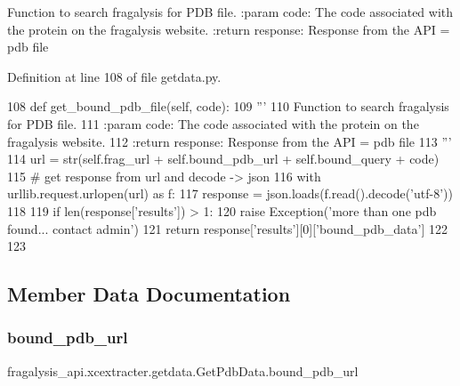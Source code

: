 \begin{DoxyVerb}Function to search fragalysis for PDB file.
:param code: The code associated with the protein on the fragalysis website.
:return response: Response from the API = pdb file
\end{DoxyVerb}
 

Definition at line 108 of file getdata.\+py.


\begin{DoxyCode}
108     \textcolor{keyword}{def }get\_bound\_pdb\_file(self, code):
109         \textcolor{stringliteral}{'''}
110 \textcolor{stringliteral}{        Function to search fragalysis for PDB file.}
111 \textcolor{stringliteral}{        :param code: The code associated with the protein on the fragalysis website.}
112 \textcolor{stringliteral}{        :return response: Response from the API = pdb file}
113 \textcolor{stringliteral}{        '''}
114         url = str(self.frag\_url + self.bound\_pdb\_url + self.bound\_query + code)
115         \textcolor{comment}{# get response from url and decode -> json}
116         with urllib.request.urlopen(url) \textcolor{keyword}{as} f:
117             response = json.loads(f.read().decode(\textcolor{stringliteral}{'utf-8'}))
118 
119         \textcolor{keywordflow}{if} len(response[\textcolor{stringliteral}{'results'}]) > 1:
120             \textcolor{keywordflow}{raise} Exception(\textcolor{stringliteral}{'more than one pdb found... contact admin'})
121         \textcolor{keywordflow}{return} response[\textcolor{stringliteral}{'results'}][0][\textcolor{stringliteral}{'bound\_pdb\_data'}]
122 
123 
\end{DoxyCode}


\subsection{Member Data Documentation}
\mbox{\label{classfragalysis__api_1_1xcextracter_1_1getdata_1_1_get_pdb_data_a1edc9f29f240166dab511937439ab355}} 
\subsubsection{\texorpdfstring{bound\+\_\+pdb\+\_\+url}{bound\_pdb\_url}}
{\footnotesize\ttfamily fragalysis\+\_\+api.\+xcextracter.\+getdata.\+Get\+Pdb\+Data.\+bound\+\_\+pdb\+\_\+url}



